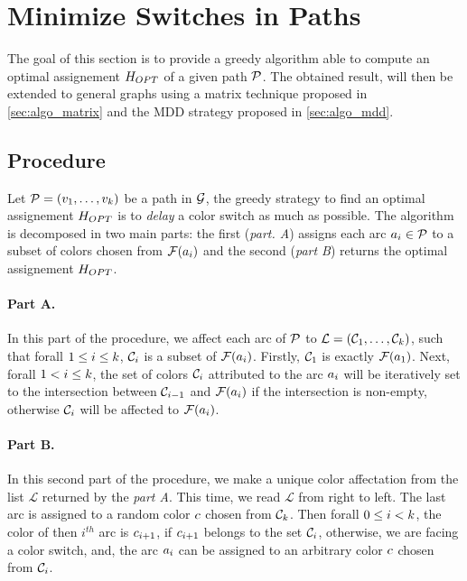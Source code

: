 \section{Minimize Switches in Paths}

The goal of this section is to provide a greedy algorithm able to compute an optimal assignement $H_{OPT}$ of a given path $\mathcal{P}$. The obtained result, will then be extended to general graphs using a matrix technique proposed in \cref{sec:algo_matrix} and the MDD strategy proposed in \cref{sec:algo_mdd}.

\subsection{Procedure}
\label{sec:path_proc}

Let $\mathcal{P} = (v_1,\ldots,v_{k})$ be a path in $\mathcal{G}$, the greedy strategy to find an optimal assignement $H_{OPT}$ is to \textit{delay} a color switch as much as possible. The algorithm is decomposed in two main parts: the first (\textit{part. A}) assigns each arc $a_i \in \mathcal{P}$ to a subset of colors chosen from $\mathcal{F}(a_i)$ and the second (\textit{part B}) returns the optimal assignement $H_{OPT}$.

\paragraph{Part A.}
In this part of the procedure, we affect each arc of $\mathcal{P}$ to $\mathcal{L} = (\mathcal{C}_1,\ldots,\mathcal{C}_{k})$, such that forall $1 \leq i \leq k$, $\mathcal{C}_i$ is a subset of $\mathcal{F}(a_i)$. Firstly, $\mathcal{C}_1$ is exactly $\mathcal{F}(a_1)$. Next, forall $1 < i \leq k$, the set of colors $\mathcal{C}_i$ attributed to the arc $a_i$ will be iteratively set to the intersection between $\mathcal{C}_{i-1}$ and $\mathcal{F}(a_i)$ if the intersection is non-empty, otherwise $\mathcal{C}_i$ will be affected to $\mathcal{F}(a_i)$.

\paragraph{Part B.}
In this second part of the procedure, we make a unique color affectation from the list $\mathcal{L}$ returned by the \textit{part A}. This time, we read $\mathcal{L}$ from right to left. The last arc is assigned to a random color $c$ chosen from $\mathcal{C}_k$. Then forall $0 \leq i < k$, the color of then $i^{th}$ arc is $c_{i+1}$, if $c_{i+1}$ belongs to the set $\mathcal{C}_i$, otherwise, we are facing a color switch, and, the arc $a_i$ can be assigned to an arbitrary color $c$ chosen from $\mathcal{C}_i$.

